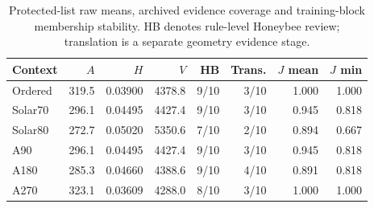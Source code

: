 \begin{table}[tbp]\centering\small\caption{Protected-list raw means, archived evidence coverage and training-block membership stability. HB denotes rule-level Honeybee review; translation is a separate geometry evidence stage.}\label{tab:evidence}
\begin{tabular}{lrrrrrrr}\toprule
Context & $A$ & $H$ & $V$ & HB & Trans. & $J$ mean & $J$ min\\\midrule
Ordered & 319.5 & 0.03900 & 4378.8 & 9/10 & 3/10 & 1.000 & 1.000\\
Solar70 & 296.1 & 0.04495 & 4427.4 & 9/10 & 3/10 & 0.945 & 0.818\\
Solar80 & 272.7 & 0.05020 & 5350.6 & 7/10 & 2/10 & 0.894 & 0.667\\
A90 & 296.1 & 0.04495 & 4427.4 & 9/10 & 3/10 & 0.945 & 0.818\\
A180 & 285.3 & 0.04660 & 4388.6 & 9/10 & 4/10 & 0.891 & 0.818\\
A270 & 323.1 & 0.03609 & 4288.0 & 8/10 & 3/10 & 1.000 & 1.000\\
\bottomrule\end{tabular}\end{table}
